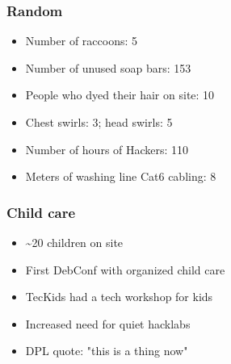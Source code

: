 \documentclass[t]{beamer}
\begin{document}
%

\begin{frame}
	\frametitle{Random}
	\begin{itemize}
		\item Number of raccoons: 5
		\item Number of unused soap bars: 153
		\item People who dyed their hair on site: 10
		\item Chest swirls: 3; head swirls: 5
		\item Number of hours of Hackers: 110
		\item Meters of washing line Cat6 cabling: 8
	\end{itemize}
\end{frame}

\begin{frame}
	\frametitle{Child care}
	\begin{itemize}
		\item \~{}20 children on site
		\item First DebConf with organized child care
		\item TecKids had a tech workshop for kids
		\item Increased need for quiet hacklabs
		\item DPL quote: "this is a thing now"
	\end{itemize}
\end{frame}
\end{document}
